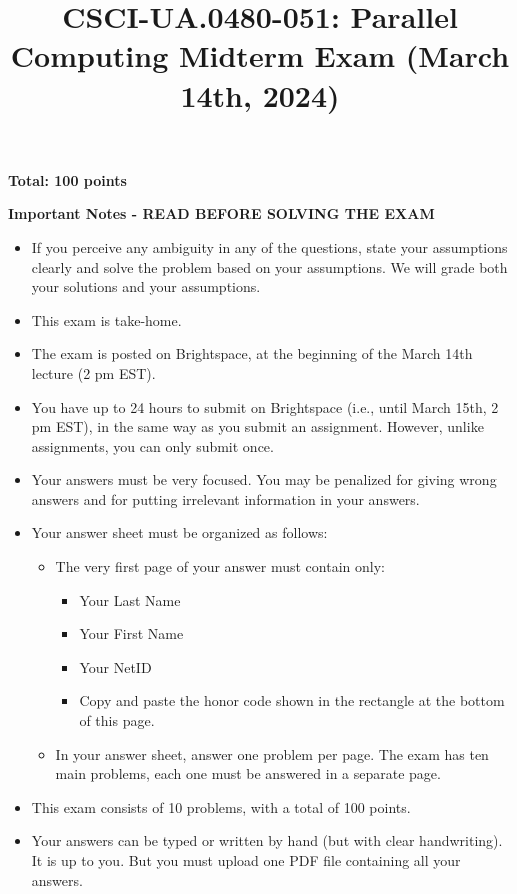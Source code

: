 \documentclass{article}
\title{CSCI-UA.0480-051: Parallel Computing Midterm Exam (March 14th, 2024)}
\author{}
\date{}
\begin{document}
\maketitle

\textbf{Total: 100 points}

\textbf{Important Notes - READ BEFORE SOLVING THE EXAM}

\begin{itemize}
    \item If you perceive any ambiguity in any of the questions, state your assumptions clearly and solve the problem based on your assumptions. We will grade both your solutions and your assumptions.
    \item This exam is take-home.
    \item The exam is posted on Brightspace, at the beginning of the March 14th lecture (2 pm EST).
    \item You have up to 24 hours to submit on Brightspace (i.e., until March 15th, 2 pm EST), in the same way as you submit an assignment. However, unlike assignments, you can only submit once.
    \item Your answers must be very focused. You may be penalized for giving wrong answers and for putting irrelevant information in your answers.
    \item Your answer sheet must be organized as follows:
    \begin{itemize}
        \item The very first page of your answer must contain only:
        \begin{itemize}
            \item Your Last Name
            \item Your First Name
            \item Your NetID
            \item Copy and paste the honor code shown in the rectangle at the bottom of this page.
        \end{itemize}
        \item In your answer sheet, answer one problem per page. The exam has ten main problems, each one must be answered in a separate page.
    \end{itemize}
    \item This exam consists of 10 problems, with a total of 100 points.
    \item Your answers can be typed or written by hand (but with clear handwriting). It is up to you. But you must upload one PDF file containing all your answers.
\end{itemize}
\end{document}
